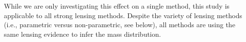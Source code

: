 While we are only investigating this effect on a single method, this study is applicable to all strong lensing methods. Despite the variety of lensing methods (i.e., parametric versus non-parametric, see below), all methods are using the same lensing evidence to infer the mass distribution. 

%
%
%
%
%
%
%
%
